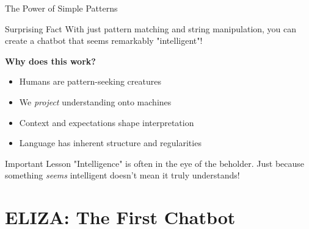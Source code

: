 \documentclass[aspectratio=169]{beamer}
\begin{document}
\begin{frame}{The Power of Simple Patterns 💪}
\small
\begin{block}{Surprising Fact}
With just pattern matching and string manipulation, you can create a chatbot that seems remarkably "intelligent"!
\end{block}

\vspace{0.3cm}

\textbf{Why does this work?}
\begin{itemize}\setlength{\itemsep}{0pt}
    \item Humans are pattern-seeking creatures
    \item We \textit{project} understanding onto machines
    \item Context and expectations shape interpretation
    \item Language has inherent structure and regularities
\end{itemize}

\vspace{0.3cm}

\begin{alertblock}{Important Lesson}
"Intelligence" is often in the eye of the beholder. Just because something \textit{seems} intelligent doesn't mean it truly understands!
\end{alertblock}
\end{frame}

\section{ELIZA: The First Chatbot}
\end{document}
